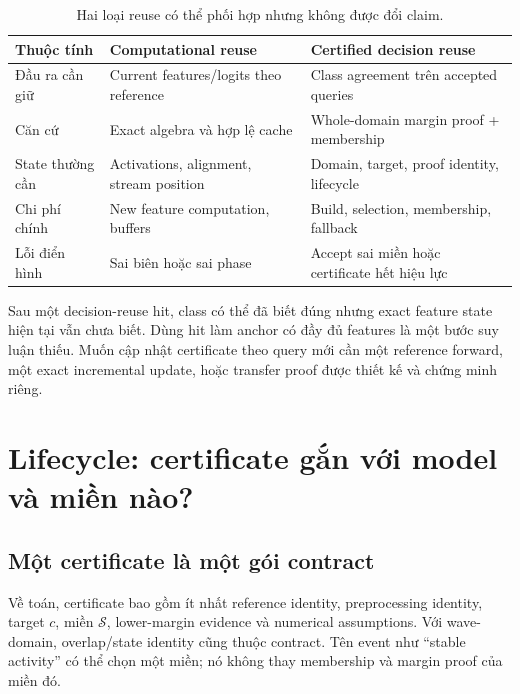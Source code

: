 \documentclass[11pt,a4paper]{article}
\newcommand{\Sset}{\mathcal S}
\theoremstyle{definition}
\begin{document}
\begin{table}[!htbp]\centering\small
\caption{Hai loại reuse có thể phối hợp nhưng không được đổi claim.}
\begin{tabularx}{\linewidth}{@{}P{2.6cm}YY@{}}\toprule
Thuộc tính & Computational reuse & Certified decision reuse\\\midrule
Đầu ra cần giữ & Current features/logits theo reference & Class agreement trên accepted queries\\
Căn cứ & Exact algebra và hợp lệ cache & Whole-domain margin proof + membership\\
State thường cần & Activations, alignment, stream position & Domain, target, proof identity, lifecycle\\
Chi phí chính & New feature computation, buffers & Build, selection, membership, fallback\\
Lỗi điển hình & Sai biên hoặc sai phase & Accept sai miền hoặc certificate hết hiệu lực\\\bottomrule
\end{tabularx}
\end{table}
Sau một decision-reuse hit, class có thể đã biết đúng nhưng exact
feature state hiện tại vẫn chưa biết. Dùng hit làm anchor có đầy đủ
features là một bước suy luận thiếu. Muốn cập nhật certificate theo
query mới cần một reference forward, một exact incremental update,
hoặc transfer proof được thiết kế và chứng minh riêng.

\section{Lifecycle: certificate gắn với model và miền nào?}
\subsection{Một certificate là một gói contract}
Về toán, certificate bao gồm ít nhất reference identity, preprocessing
identity, target $c$, miền $\Sset$, lower-margin evidence và numerical
assumptions. Với wave-domain, overlap/state identity cũng thuộc contract.
Tên event như ``stable activity'' có thể chọn một miền; nó không thay
membership và margin proof của miền đó.
\end{document}
